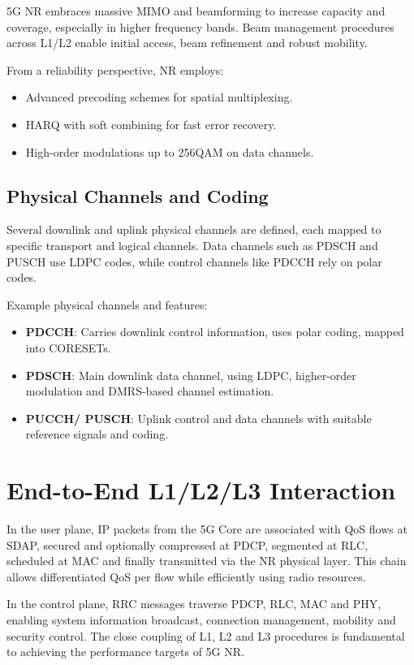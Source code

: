 \documentclass[12pt,a4paper]{article}
\begin{document}
5G NR embraces massive MIMO and beamforming to increase capacity and coverage, especially in higher frequency bands. Beam management procedures across L1/L2 enable initial access, beam refinement and robust mobility.

From a reliability perspective, NR employs:
\begin{itemize}
  \item Advanced precoding schemes for spatial multiplexing.
  \item HARQ with soft combining for fast error recovery.
  \item High-order modulations up to 256QAM on data channels.
\end{itemize}

\subsection{Physical Channels and Coding}

Several downlink and uplink physical channels are defined, each mapped to specific transport and logical channels. Data channels such as PDSCH and PUSCH use LDPC codes, while control channels like PDCCH rely on polar codes.

Example physical channels and features: 
\begin{itemize}
  \item \textbf{PDCCH}: Carries downlink control information, uses polar coding, mapped into CORESETs.
  \item \textbf{PDSCH}: Main downlink data channel, using LDPC, higher-order modulation and DMRS-based channel estimation.
  \item \textbf{PUCCH/ PUSCH}: Uplink control and data channels with suitable reference signals and coding.
\end{itemize}

\section{End-to-End L1/L2/L3 Interaction}

In the user plane, IP packets from the 5G Core are associated with QoS flows at SDAP, secured and optionally compressed at PDCP, segmented at RLC, scheduled at MAC and finally transmitted via the NR physical layer. This chain allows differentiated QoS per flow while efficiently using radio resources. 

In the control plane, RRC messages traverse PDCP, RLC, MAC and PHY, enabling system information broadcast, connection management, mobility and security control. The close coupling of L1, L2 and L3 procedures is fundamental to achieving the performance targets of 5G NR.
\end{document}
